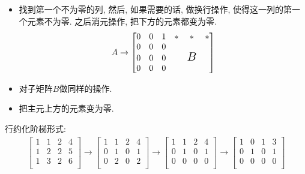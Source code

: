 \begin{itemize}
    \item 找到第一个不为零的列, 然后, 如果需要的话, 做换行操作, 使得这一列的第一个元素不为零. 之后消元操作, 把下方的元素都变为零.
    \begin{equation}
      A \to \begin{bmatrix}
       0 & 0 & 1 & * & * & *\\
       0 & 0 & 0 &  &  & \\
       0 & 0 & 0 &  & \text{\Large $B$} & \\
       0 & 0 & 0 &  &  & \\
      \end{bmatrix}
    \end{equation}

    \item 对子矩阵$B$做同样的操作.
    
    \item 把主元上方的元素变为零.
\end{itemize}


\begin{example}\label{reduction}
    行约化阶梯形式:
    \begin{equation}
      \begin{gathered}
        \begin{bmatrix}
         1 & 1 & 2 & 4\\
         1 & 2 & 2 & 5\\
         1 & 3 & 2 & 6\\
        \end{bmatrix}
        \longrightarrow
        \begin{bmatrix}
         1 & 1 & 2 & 4\\
         0 & 1 & 0 & 1\\
         0 & 2 & 0 & 2\\
        \end{bmatrix}
        \longrightarrow
        \begin{bmatrix}
         1 & 1 & 2 & 4\\
         0 & 1 & 0 & 1\\
         0 & 0 & 0 & 0\\
        \end{bmatrix}
        \longrightarrow
        \begin{bmatrix}
         1 & 0 & 1 & 3\\
         0 & 1 & 0 & 1\\
         0 & 0 & 0 & 0\\
        \end{bmatrix}
      \end{gathered}
    \end{equation}
\end{example}


